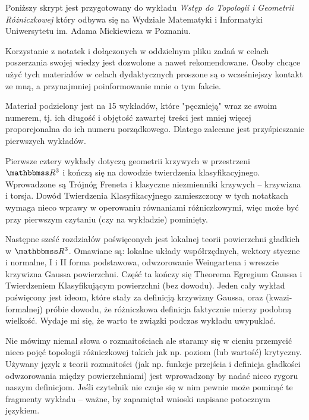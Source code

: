 \thispagestyle{empty}
Poniższy skrypt jest przygotowany do wykładu \textit{Wstęp 
do Topologii i Geometrii Różniczkowej} kt\'ory odbywa się na  Wydziale 
Matematyki i Informatyki Uniwersytetu im. Adama Mickiewicza w Poznaniu.

Korzystanie z notatek i dołączonych w oddzielnym pliku zadań w celach 
poszerzania swojej wiedzy jest dozwolone a nawet rekomendowane. Osoby chcące 
użyć tych materiałów w celach dydaktycznych proszone są o wcześniejszy kontakt 
ze mną, a przynajmniej poinformowanie mnie o tym fakcie.

\thispagestyle{empty}

Materiał podzielony jest na 15 wykładów, które "pęcznieją" wraz ze swoim 
numerem, tj. ich długość i objętość zawartej treści jest mniej więcej 
proporcjonalna do ich numeru porządkowego. Dlatego zalecane jest przyśpieszanie 
pierwszych wykładów. 

Pierwsze cztery wykłady dotyczą geometrii krzywych w przestrzeni $\R^3$ i 
kończą się na dowodzie twierdzenia klasyfikacyjnego. Wprowadzone są Tr\'ojn\'og 
Freneta i klasyczne niezmienniki krzywych -- krzywizna i torsja. Dow\'od 
Twierdzenia Klasyfikacyjnego zamieszczony w tych notatkach wymaga nieco wprawy w 
operowaniu r\'ownaniami r\'ożniczkowymi, więc może być przy pierwszym czytaniu 
(czy na wykładzie) pominięty.

Następne sześć rozdział\'ow poświęconych jest lokalnej teorii powierzchni 
gładkich w $\R^3$. Omawiane są: lokalne układy wsp\'ołrzędnych, wektory styczne 
i normalne, I i II forma podstawowa, odwzorowanie Weingartena i wreszcie 
krzywizna Gaussa powierzchni. Część ta kończy się Theorema Egregium Gaussa i 
Twierdzeniem Klasyfikującym powierzchni (bez dowodu). Jeden cały wykład 
poświęcony jest ideom, kt\'ore stały za definicją krzywizny Gaussa, oraz 
(kwazi-formalnej) pr\'obie dowodu, że r\'ożniczkowa definicja faktycznie mierzy 
podobną wielkość. Wydaje mi się, że warto te związki podczas wykładu uwypuklać.

Nie m\'owimy niemal słowa o rozmaitościach ale staramy się w cieniu przemycić 
nieco pojęć topologii r\'ożniczkowej takich jak np. poziom (lub wartość) 
krytyczny. Używany język z teorii rozmaitości (jak np. funkcje przejścia i 
definicja gładkości odwzorowania między powierzchniami) jest wprowadzony by 
nadać nieco rygoru naszym definicjom. Jeśli czytelnik nie czuje się w nim pewnie 
może pominąć te fragmenty wykładu -- ważne, by zapamiętał wnioski napisane 
potocznym językiem.

